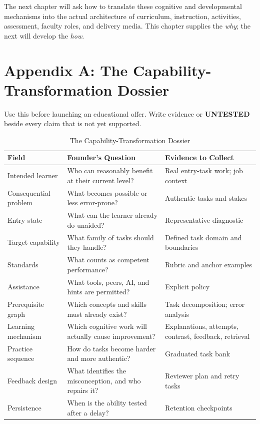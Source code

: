 The next chapter will ask how to translate these cognitive and developmental mechanisms into the actual architecture of curriculum, instruction, activities, assessment, faculty roles, and delivery media. This chapter supplies the \emph{why}; the next will develop the \emph{how}.

\section*{Appendix A: The Capability-Transformation Dossier}

Use this before launching an educational offer. Write evidence or \textbf{UNTESTED} beside every claim that is not yet supported.

\begin{table}[t]
\centering
\small
\caption{The Capability-Transformation Dossier}
\begin{tabularx}{\textwidth}{p{}p{}X}
\toprule
\textbf{Field} & \textbf{Founder's Question} & \textbf{Evidence to Collect} \\
\midrule
Intended learner & Who can reasonably benefit at their current level? & Real entry-task work; job context \\
Consequential problem & What becomes possible or less error-prone? & Authentic tasks and stakes \\
Entry state & What can the learner already do unaided? & Representative diagnostic \\
Target capability & What family of tasks should they handle? & Defined task domain and boundaries \\
Standards & What counts as competent performance? & Rubric and anchor examples \\
Assistance & What tools, peers, AI, and hints are permitted? & Explicit policy \\
Prerequisite graph & Which concepts and skills must already exist? & Task decomposition; error analysis \\
Learning mechanism & Which cognitive work will actually cause improvement? & Explanations, attempts, contrast, feedback, retrieval \\
Practice sequence & How do tasks become harder and more authentic? & Graduated task bank \\
Feedback design & What identifies the misconception, and who repairs it? & Reviewer plan and retry tasks \\
Persistence & When is the ability tested after a delay? & Retention checkpoints \\

\end{tabularx}
\end{table}
